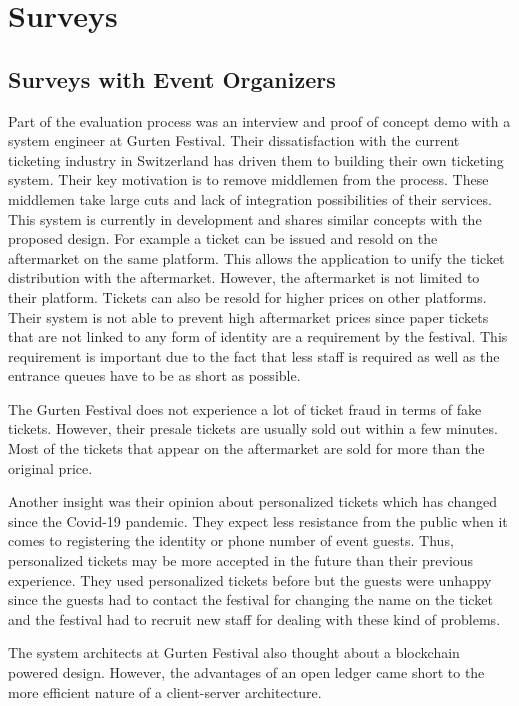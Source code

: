 \section{Surveys}

\subsection{Surveys with Event Organizers}

Part of the evaluation process was an interview and proof of concept demo with a system engineer at Gurten Festival. Their dissatisfaction with the current ticketing industry in Switzerland has driven them to building their own ticketing system. Their key motivation is to remove middlemen from the process. These middlemen take large cuts and lack of integration possibilities of their services. This system is currently in development and shares similar concepts with the proposed design. For example a ticket can be issued and resold on the aftermarket on the same platform. This allows the application to unify the ticket distribution with the aftermarket. However, the aftermarket is not limited to their platform. Tickets can also be resold for higher prices on other platforms. Their system is not able to prevent high aftermarket prices since paper tickets that are not linked to any form of identity are a requirement by the festival. This requirement is important due to the fact that less staff is required as well as the entrance queues have to be as short as possible. 

The Gurten Festival does not experience a lot of ticket fraud in terms of fake tickets. However, their presale tickets are usually sold out within a few minutes. Most of the tickets that appear on the aftermarket are sold for more than the original price.

Another insight was their opinion about personalized tickets which has changed since the Covid-19 pandemic. They expect less resistance from the public when it comes to registering the identity or phone number of event guests. Thus, personalized tickets may be more accepted in the future than their previous experience. They used personalized tickets before but the guests were unhappy since the guests had to contact the festival for changing the name on the ticket and the festival had to recruit new staff for dealing with these kind of problems. 

The system architects at Gurten Festival also thought about a blockchain powered design. However, the advantages of an open ledger came short to the more efficient nature of a client-server architecture.

